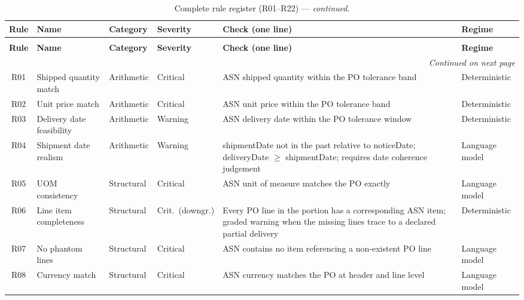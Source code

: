 \footnotesize
\begin{longtable}{@{}cp{3.2cm}p{1.8cm}p{1.8cm}p{4.2cm}p{2cm}@{}}
\caption{Complete rule register (R01--R22).} \label{tab:app:rules} \\
\toprule
\textbf{Rule} & \textbf{Name} & \textbf{Category} & \textbf{Severity} & \textbf{Check (one line)} & \textbf{Regime} \\
\midrule
\endfirsthead
\caption[]{Complete rule register (R01--R22) --- \emph{continued}.} \\
\toprule
\textbf{Rule} & \textbf{Name} & \textbf{Category} & \textbf{Severity} & \textbf{Check (one line)} & \textbf{Regime} \\
\midrule
\endhead
\midrule
\multicolumn{6}{r}{\emph{Continued on next page}} \\
\endfoot
\bottomrule
\endlastfoot
R01 & Shipped quantity match        & Arithmetic  & Critical      & ASN shipped quantity within the PO tolerance band                                        & Deterministic \\
R02 & Unit price match              & Arithmetic  & Critical      & ASN unit price within the PO tolerance band                                              & Deterministic \\
R03 & Delivery date feasibility     & Arithmetic  & Warning       & ASN delivery date within the PO tolerance window                                         & Deterministic \\
R04 & Shipment date realism         & Arithmetic  & Warning       & shipmentDate not in the past relative to noticeDate; deliveryDate $\geq$ shipmentDate; requires date coherence judgement    & Language model \\
R05 & UOM consistency               & Structural  & Critical      & ASN unit of measure matches the PO exactly                                               & Language model \\
R06 & Line item completeness        & Structural  & Crit.\ (downgr.) & Every PO line in the portion has a corresponding ASN item; graded warning when the missing lines trace to a declared partial delivery & Deterministic \\
R07 & No phantom lines              & Structural  & Critical      & ASN contains no item referencing a non-existent PO line                                  & Language model \\
R08 & Currency match                & Structural  & Critical      & ASN currency matches the PO at header and line level                                     & Language model \\

\end{longtable}
